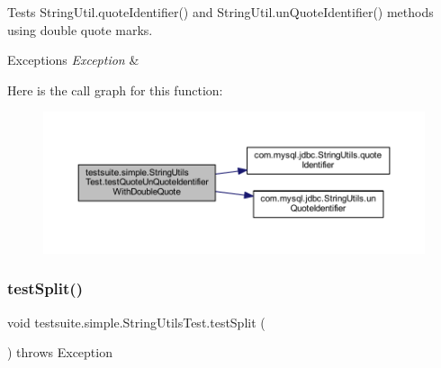 Tests String\+Util.\+quote\+Identifier() and String\+Util.\+un\+Quote\+Identifier() methods using double quote marks.


\begin{DoxyExceptions}{Exceptions}
{\em Exception} & \\
\hline
\end{DoxyExceptions}
Here is the call graph for this function\+:
\nopagebreak
\begin{figure}[H]
\begin{center}
\leavevmode
\includegraphics[width=350pt]{classtestsuite_1_1simple_1_1_string_utils_test_adb8f4c412143b740afd9fe6c70018660_cgraph}
\end{center}
\end{figure}
\mbox{\label{classtestsuite_1_1simple_1_1_string_utils_test_a535b80b532dc2f62828f79c5fec8605f}} 
\subsubsection{\texorpdfstring{test\+Split()}{testSplit()}}
{\footnotesize\ttfamily void testsuite.\+simple.\+String\+Utils\+Test.\+test\+Split (\begin{DoxyParamCaption}{ }\end{DoxyParamCaption}) throws Exception}

